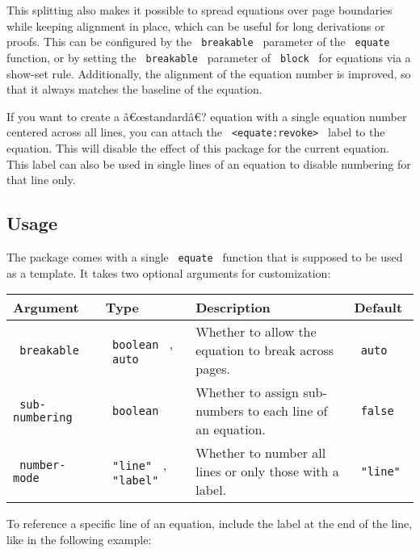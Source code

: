 This splitting also makes it possible to spread equations over page
boundaries while keeping alignment in place, which can be useful for
long derivations or proofs. This can be configured by the
\texttt{\ breakable\ } parameter of the \texttt{\ equate\ } function, or
by setting the \texttt{\ breakable\ } parameter of \texttt{\ block\ }
for equations via a show-set rule. Additionally, the alignment of the
equation number is improved, so that it always matches the baseline of
the equation.

If you want to create a â€œstandardâ€? equation with a single equation
number centered across all lines, you can attach the
\texttt{\ \textless{}equate:revoke\textgreater{}\ } label to the
equation. This will disable the effect of this package for the current
equation. This label can also be used in single lines of an equation to
disable numbering for that line only.

\subsection{Usage}\label{usage}

The package comes with a single \texttt{\ equate\ } function that is
supposed to be used as a template. It takes two optional arguments for
customization:

\begin{longtable}[]{@{}llll@{}}
\toprule\noalign{}
Argument & Type & Description & Default \\
\midrule\noalign{}
\endhead
\bottomrule\noalign{}
\endlastfoot
\texttt{\ breakable\ } & \texttt{\ boolean\ } , \texttt{\ auto\ } &
Whether to allow the equation to break across pages. &
\texttt{\ auto\ } \\
\texttt{\ sub-numbering\ } & \texttt{\ boolean\ } & Whether to assign
sub-numbers to each line of an equation. & \texttt{\ false\ } \\
\texttt{\ number-mode\ } & \texttt{\ "line"\ } , \texttt{\ "label"\ } &
Whether to number all lines or only those with a label. &
\texttt{\ "line"\ } \\
\end{longtable}

To reference a specific line of an equation, include the label at the
end of the line, like in the following example:

